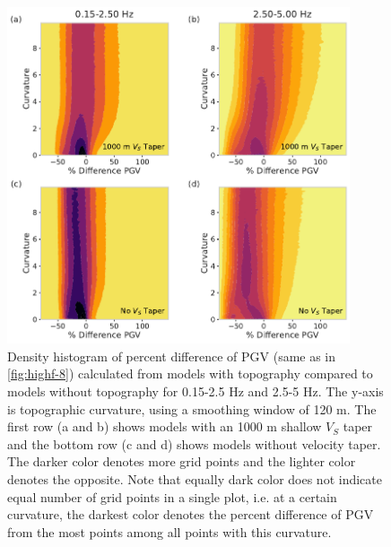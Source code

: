 \begin{figure}[!ht]
  \centering
  \includegraphics[width=0.9\textwidth,height=0.9\textheight,keepaspectratio]{figures/figure_highf_S2.pdf}
  \caption{
    Density histogram of percent difference of PGV (same as in \cref{fig:highf-8}) calculated from models with topography compared to models without topography for 0.15-2.5 Hz and 2.5-5 Hz. The y-axis is topographic curvature, using a smoothing window of 120 m. The first row (a and b) shows models with an 1000 m shallow $V_S$ taper and the bottom row (c and d) shows models without velocity taper. The darker color denotes more grid points and the lighter color denotes the opposite. Note that equally dark color does not indicate equal number of grid points in a single plot, i.e. at a certain curvature, the darkest color denotes the percent difference of PGV from the most points among all points with this curvature.
  }
  \label{fig:highf-S2}
\end{figure}
\clearpage




\renewcommand{\thetable}{\arabic{table}}
\renewcommand{\thefigure}{\arabic{figure}}



